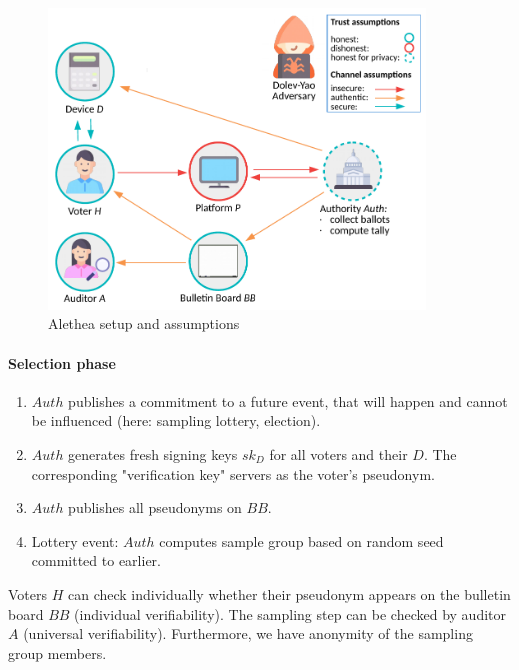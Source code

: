 \begin{figure}[h]
    \centering
    \includegraphics[width=10cm]{images/ch13-rsv-setup.png}
    \caption{Alethea setup and assumptions}
    \label{fig:rsv-setup}
\end{figure}

\paragraph{Selection phase}
\begin{enumerate}
    \item $Auth$ publishes a commitment to a future event, that will happen and cannot be influenced (here: sampling lottery, election).
    \item $Auth$ generates fresh signing keys $sk_D$ for all voters and their $D$. The corresponding "verification key" servers as the voter's pseudonym.
    \item $Auth$ publishes all pseudonyms on $BB$.
    \item Lottery event: $Auth$ computes sample group based on random seed committed to earlier.
\end{enumerate}
Voters $H$ can check individually whether their pseudonym appears on the bulletin board $BB$ (individual verifiability). The sampling step can be checked by auditor $A$ (universal verifiability). Furthermore, we have anonymity of the sampling group members.

